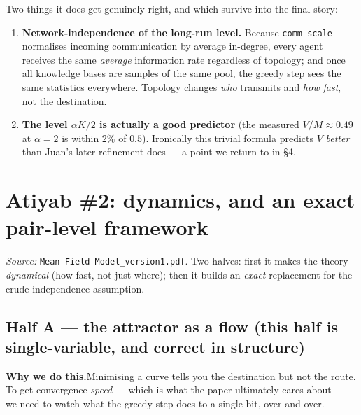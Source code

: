 \documentclass[11pt]{article}
\newcommand{\why}[1]{%
  \par\smallskip\noindent
  \colorbox{blue!8}{\parbox{\dimexpr\linewidth-2\fboxsep}{%
  \textbf{Why we do this.}\quad #1}}\par\smallskip}
\begin{document}
Two things it does get genuinely right, and which survive into the final story:
\begin{enumerate}[nosep]
  \item \textbf{Network-independence of the long-run level.} Because \texttt{comm\_scale}
        normalises incoming communication by average in-degree, every agent receives the same
        \emph{average} information rate regardless of topology; and once all knowledge bases are
        samples of the same pool, the greedy step sees the same statistics everywhere. Topology
        changes \emph{who} transmits and \emph{how fast}, not the destination.
  \item \textbf{The level $\alpha K/2$ is actually a good predictor} (the measured $V/M\approx0.49$
        at $\alpha=2$ is within $2\%$ of $0.5$). Ironically this trivial formula predicts $V$
        \emph{better} than Juan's later refinement does --- a point we return to in \S4.
\end{enumerate}

\section{Atiyab \#2: dynamics, and an exact pair-level framework}
\emph{Source: }\texttt{Mean Field Model\_version1.pdf}. Two halves: first it makes the theory
\emph{dynamical} (how fast, not just where); then it builds an \emph{exact} replacement for the
crude independence assumption.

\subsection{Half A --- the attractor as a flow (this half is single-variable, and correct in
structure)}
\why{Minimising a curve tells you the destination but not the route. To get convergence
\emph{speed} --- which is what the paper ultimately cares about --- we need to watch what the
greedy step does to a single bit, over and over.}
\end{document}
